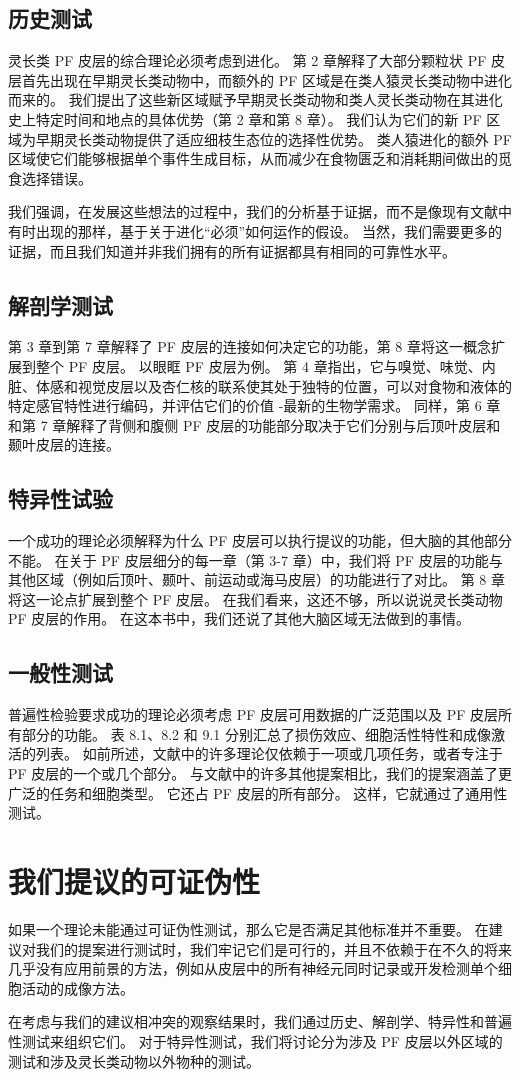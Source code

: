\subsection{历史测试}
灵长类 PF 皮层的综合理论必须考虑到进化。 第 2 章解释了大部分颗粒状 PF 皮层首先出现在早期灵长类动物中，而额外的 PF 区域是在类人猿灵长类动物中进化而来的。 我们提出了这些新区域赋予早期灵长类动物和类人灵长类动物在其进化史上特定时间和地点的具体优势（第 2 章和第 8 章）。 我们认为它们的新 PF 区域为早期灵长类动物提供了适应细枝生态位的选择性优势。 类人猿进化的额外 PF 区域使它们能够根据单个事件生成目标，从而减少在食物匮乏和消耗期间做出的觅食选择错误。
\par 
我们强调，在发展这些想法的过程中，我们的分析基于证据，而不是像现有文献中有时出现的那样，基于关于进化“必须”如何运作的假设。 当然，我们需要更多的证据，而且我们知道并非我们拥有的所有证据都具有相同的可靠性水平。
\subsection{解剖学测试}
第 3 章到第 7 章解释了 PF 皮层的连接如何决定它的功能，第 8 章将这一概念扩展到整个 PF 皮层。 以眼眶 PF 皮层为例。 第 4 章指出，它与嗅觉、味觉、内脏、体感和视觉皮层以及杏仁核的联系使其处于独特的位置，可以对食物和液体的特定感官特性进行编码，并评估它们的价值 -最新的生物学需求。 同样，第 6 章和第 7 章解释了背侧和腹侧 PF 皮层的功能部分取决于它们分别与后顶叶皮层和颞叶皮层的连接。
\subsection{特异性试验} 
一个成功的理论必须解释为什么 PF 皮层可以执行提议的功能，但大脑的其他部分不能。 在关于 PF 皮层细分的每一章（第 3-7 章）中，我们将 PF 皮层的功能与其他区域（例如后顶叶、颞叶、前运动或海马皮层）的功能进行了对比。 第 8 章将这一论点扩展到整个 PF 皮层。 在我们看来，这还不够，所以说说灵长类动物 PF 皮层的作用。 在这本书中，我们还说了其他大脑区域无法做到的事情。
\subsection{一般性测试}
普遍性检验要求成功的理论必须考虑 PF 皮层可用数据的广泛范围以及 PF 皮层所有部分的功能。 表 8.1、8.2 和 9.1 分别汇总了损伤效应、细胞活性特性和成像激活的列表。 如前所述，文献中的许多理论仅依赖于一项或几项任务，或者专注于 PF 皮层的一个或几个部分。 与文献中的许多其他提案相比，我们的提案涵盖了更广泛的任务和细胞类型。 它还占 PF 皮层的所有部分。 这样，它就通过了通用性测试。
\section{我们提议的可证伪性}
如果一个理论未能通过可证伪性测试，那么它是否满足其他标准并不重要。 在建议对我们的提案进行测试时，我们牢记它们是可行的，并且不依赖于在不久的将来几乎没有应用前景的方法，例如从皮层中的所有神经元同时记录或开发检测单个细胞活动的成像方法。
\par 
在考虑与我们的建议相冲突的观察结果时，我们通过历史、解剖学、特异性和普遍性测试来组织它们。 对于特异性测试，我们将讨论分为涉及 PF 皮层以外区域的测试和涉及灵长类动物以外物种的测试。
